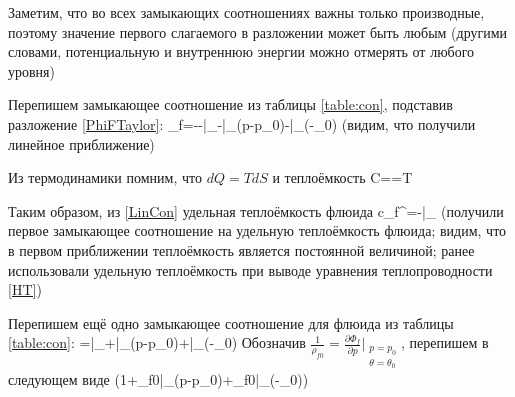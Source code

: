 \documentclass[main.tex]{subfiles}
\begin{document}
Заметим, что во всех замыкающих соотношениях важны только производные, поэтому значение первого слагаемого в разложении может быть любым (другими словами, потенциальную и внутреннюю энергии можно отмерять от любого уровня)

Перепишем замыкающее соотношение из таблицы \ref{table:con}, подставив разложение \ref{PhiFTaylor}:
\beq\label{LinCon}
\eta_f=-\approx -\bigg|_{}-\bigg|_{}\left(p-p_0\right)-\bigg|_{}\left(\theta-\theta_0\right)
\eeq
(видим, что получили линейное приближение)

Из термодинамики помним, что $dQ=TdS$ и теплоёмкость
\beq
C==T
\eeq

Таким образом, из \eqref{LinCon} удельная теплоёмкость флюида
\beq\label{CF}
c_f^\theta=\theta{}\approx-\theta{}\bigg|_{}
\eeq
(получили первое замыкающее соотношение на удельную теплоёмкость флюида; видим, что в первом приближении теплоёмкость является постоянной величиной; ранее использовали удельную теплоёмкость при выводе уравнения теплопроводности \eqref{HT})

Перепишем ещё одно замыкающее соотношение для флюида из таблицы \ref{table:con}:
\beq
{}=\approx{}\bigg|_{}+\bigg|_{}\left(p-p_0\right)+\bigg|_{}\left(\theta-\theta_0\right)
\eeq
Обозначив $\displaystyle{}\frac{1}{\rho_{f0}}=\frac{\partial\Phi_f}{\partial p}\bigg|_{\substack{p=p_0\\ \theta=\theta_0}}$, перепишем в следующем виде
\beq\label{RhoF}
\approx{}\left(1+\rho_{f0}\bigg|_{}\left(p-p_0\right)+\rho_{f0}\bigg|_{}\left(\theta-\theta_0\right)\right)
\eeq
\end{document}
